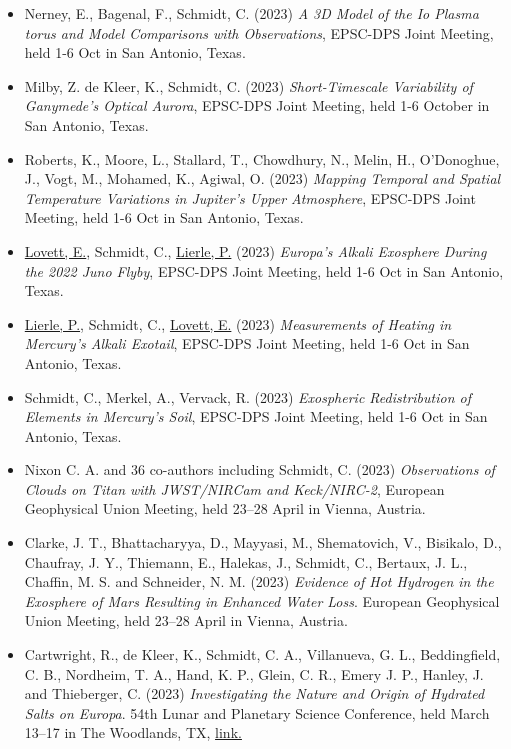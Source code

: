 \documentclass[12pt]{report}
\begin{document}
\begin{itemize}
   \item Nerney, E., Bagenal, F., Schmidt, C. (2023) \textit{A 3D Model of the Io Plasma torus and Model Comparisons with Observations}, EPSC-DPS Joint Meeting, held 1-6 Oct in San Antonio, Texas.
   \item Milby, Z. de Kleer, K., Schmidt, C. (2023) \textit{Short-Timescale Variability of Ganymede's Optical Aurora}, EPSC-DPS Joint Meeting, held 1-6 October in San Antonio, Texas.	
   \item Roberts, K., Moore, L., Stallard, T., Chowdhury, N., Melin, H., O'Donoghue, J., Vogt, M., Mohamed, K., Agiwal, O. (2023) \textit{Mapping Temporal and Spatial Temperature Variations in Jupiter’s Upper Atmosphere}, EPSC-DPS Joint Meeting, held 1-6 Oct in San Antonio, Texas.	
   \item \underline{Lovett, E.}, Schmidt, C., \underline{Lierle, P.} (2023) \textit{Europa's Alkali Exosphere During the 2022 Juno Flyby}, EPSC-DPS Joint Meeting, held 1-6 Oct in San Antonio, Texas.	
   \item \underline{Lierle, P.}, Schmidt, C., \underline{Lovett, E.} (2023) \textit{Measurements of Heating in Mercury's Alkali Exotail}, EPSC-DPS Joint Meeting, held 1-6 Oct in San Antonio, Texas.
   \item Schmidt, C., Merkel, A., Vervack, R. (2023) \textit{Exospheric Redistribution of Elements in Mercury’s Soil}, EPSC-DPS Joint Meeting, held 1-6 Oct in San Antonio, Texas.
   \item Nixon C. A. and 36 co-authors including Schmidt, C. (2023) \textit{Observations of Clouds on Titan with JWST/NIRCam and Keck/NIRC-2}, European Geophysical Union Meeting, held 23–28 April in Vienna, Austria.
   \item Clarke, J. T., Bhattacharyya, D., Mayyasi, M., Shematovich, V., Bisikalo, D., Chaufray, J. Y., Thiemann, E., Halekas, J., Schmidt, C., Bertaux, J. L., Chaffin, M. S. and Schneider, N. M. (2023) \textit{Evidence of Hot Hydrogen in the Exosphere of Mars Resulting in Enhanced Water Loss}. European Geophysical Union Meeting, held 23–28 April in Vienna, Austria.
   \item Cartwright, R., de Kleer, K., Schmidt, C. A., Villanueva, G. L., Beddingfield, C. B., Nordheim, T. A., Hand, K. P., Glein, C. R., Emery J. P., Hanley, J. and Thieberger, C. (2023) \textit{Investigating the Nature and Origin of Hydrated Salts on Europa}. 54th Lunar and Planetary Science Conference, held March 13–17 in The Woodlands, TX, \href{https://www.hou.usra.edu/meetings/lpsc2023/pdf/2215.pdf/}{link.}

\end{itemize}
\end{document}
